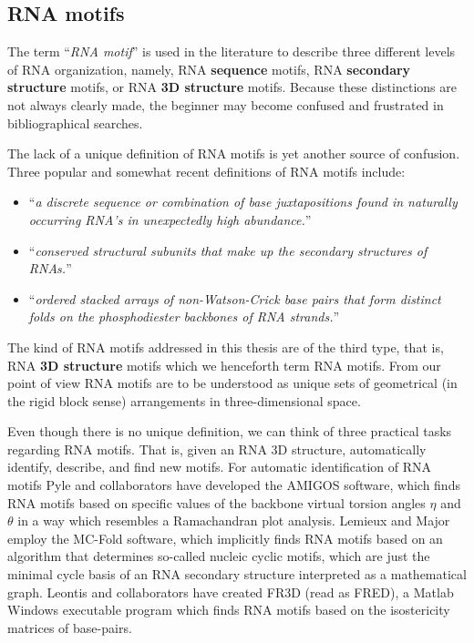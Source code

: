 \subsection{RNA motifs}
The term ``\textit{RNA motif}'' is  used in the literature to describe
three   different   levels    of   RNA   organization,   namely,   RNA
\textbf{sequence} motifs, RNA  \textbf{secondary structure} motifs, or
RNA \textbf{3D structure} motifs.   Because these distinctions are not
always clearly  made, the beginner may become  confused and frustrated
in bibliographical searches.

The lack of a unique definition of RNA motifs is yet another source of
confusion.  Three  popular and  somewhat  recent  definitions of  RNA
motifs include:
\begin{itemize}
\item{``\textit{a discrete sequence or combination of
    base  juxtapositions   found  in  naturally   occurring  RNA's  in
    unexpectedly high abundance.}''\cite{moore1999}}
\item{``\textit{conserved structural subunits that make
    up the secondary structures of RNAs.}''\cite{holbrook2005}}
\item{``\textit{ordered   stacked    arrays   of
    non-Watson-Crick  base  pairs  that  form distinct  folds  on  the
    phosphodiester backbones of RNA strands.}''\cite{leontis2003}}
\end{itemize}

The  kind of RNA  motifs addressed in this
thesis are of the third type, that is, RNA \textbf{3D structure}
motifs  which we henceforth term RNA  motifs.
From our point of view RNA motifs are to be understood as  unique
sets of geometrical  (in the rigid block sense)  arrangements in
three-dimensional space.

Even  though there  is no  unique definition,  we can  think  of three
practical  tasks regarding  RNA  motifs.   That is,  given  an RNA  3D
structure, automatically identify, describe,  and find new motifs.  For
automatic  identification of  RNA motifs  Pyle and  collaborators have
developed  the AMIGOS software, which finds  RNA motifs
based on  specific values of the backbone virtual  torsion angles $\eta$
and  $\theta$  \cite{olson1980, malathi1985,  duarte2003} in  a  way  which
resembles   a   Ramachandran  plot   analysis.    Lemieux  and   Major
\cite{lemieux2006}  employ  the  MC-Fold software,  which  implicitly
finds RNA motifs based on  an algorithm that determines so-called nucleic
cyclic  motifs, which  are  just the  minimal  cycle basis  of an  RNA
secondary  structure  interpreted as  a  mathematical graph.   Leontis
\cite{nasalean2009}  and collaborators have created FR3D  (read  as FRED),
a Matlab  Windows executable program  which finds  RNA motifs
based on the isostericity matrices of base-pairs.

